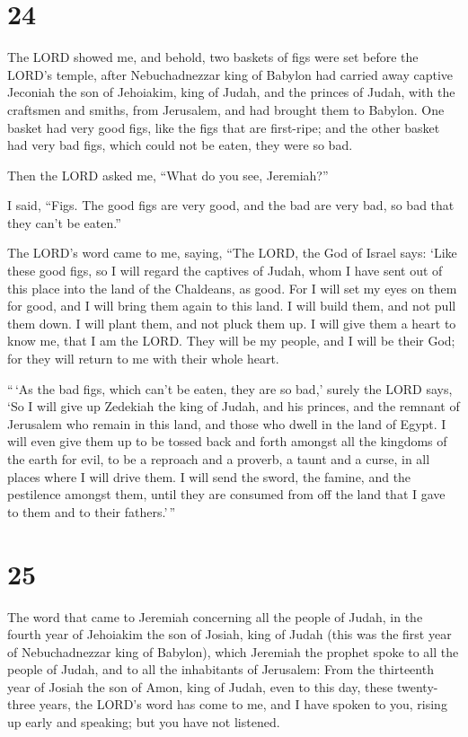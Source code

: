 \hypertarget{section-23}{%
\section{24}\label{section-23}}

 The LORD showed me, and behold, two baskets of figs were
set before the LORD's temple, after Nebuchadnezzar king of Babylon had
carried away captive Jeconiah the son of Jehoiakim, king of Judah, and
the princes of Judah, with the craftsmen and smiths, from Jerusalem, and
had brought them to Babylon.  One basket had very good figs,
like the figs that are first-ripe; and the other basket had very bad
figs, which could not be eaten, they were so bad.

 Then the LORD asked me, ``What do you see, Jeremiah?''

I said, ``Figs. The good figs are very good, and the bad are very bad,
so bad that they can't be eaten.''

 The LORD's word came to me, saying,  ``The
LORD, the God of Israel says: `Like these good figs, so I will regard
the captives of Judah, whom I have sent out of this place into the land
of the Chaldeans, as good.  For I will set my eyes on them
for good, and I will bring them again to this land. I will build them,
and not pull them down. I will plant them, and not pluck them up.
 I will give them a heart to know me, that I am the LORD.
They will be my people, and I will be their God; for they will return to
me with their whole heart.

 ``\,`As the bad figs, which can't be eaten, they are so
bad,' surely the LORD says, `So I will give up Zedekiah the king of
Judah, and his princes, and the remnant of Jerusalem who remain in this
land, and those who dwell in the land of Egypt.  I will even
give them up to be tossed back and forth amongst all the kingdoms of the
earth for evil, to be a reproach and a proverb, a taunt and a curse, in
all places where I will drive them.  I will send the sword,
the famine, and the pestilence amongst them, until they are consumed
from off the land that I gave to them and to their fathers.'\,''

\hypertarget{section-24}{%
\section{25}\label{section-24}}

 The word that came to Jeremiah concerning all the people of
Judah, in the fourth year of Jehoiakim the son of Josiah, king of Judah
(this was the first year of Nebuchadnezzar king of Babylon),
 which Jeremiah the prophet spoke to all the people of
Judah, and to all the inhabitants of Jerusalem:  From the
thirteenth year of Josiah the son of Amon, king of Judah, even to this
day, these twenty-three years, the LORD's word has come to me, and I
have spoken to you, rising up early and speaking; but you have not
listened.

